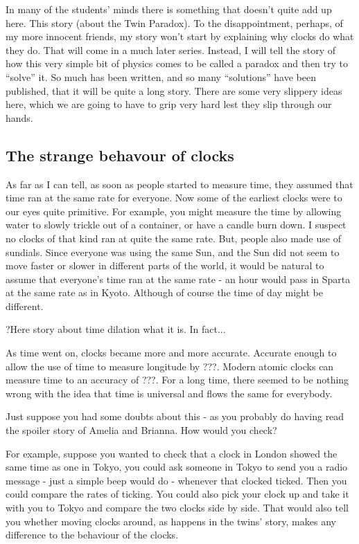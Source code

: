 \documentclass[a4paper]{report}
\begin{document}
In many of the students' minds there is something that doesn't quite add up here. This story (about the Twin Paradox). To the disappointment, perhaps, of my more innocent friends, my story won't start by explaining why clocks do what they do. That will come in a much later series. Instead, I will tell the story of how this very simple bit of physics comes to be called a paradox and then try to ``solve'' it. So much has been written, and so many ``solutions'' have been published, that it will be quite a long story. There are some very slippery ideas here, which we are going to have to grip very hard lest they slip through our hands.

\subsection*{The strange behavour of clocks}
As far as I can tell, as soon as people started to measure time, they assumed that time ran at the same rate for everyone. Now some of the earliest clocks were to our eyes quite primitive. For example, you might measure the time by allowing water to slowly trickle out of a container, or have a candle burn down. I suspect no clocks of that kind ran at quite the same rate. But, people also made use of sundials. Since everyone was using the same Sun, and the Sun did not seem to move faster or slower in different parts of the world, it would be natural to assume that everyone's time ran at the same rate - an hour would pass in Sparta at the same rate as in Kyoto. Although of course the time of day might be different.

?Here story about time dilation what it is. In fact...

As time went on, clocks became more and more accurate. Accurate enough to allow the use of time to measure longitude by ???. Modern atomic clocks can measure time to an accuracy of ???. For a long time, there seemed to be nothing wrong with the idea that time is universal and flows the same for everybody.

Just suppose you had some doubts about this - as you probably do having read the spoiler story of Amelia and Brianna. How would you check?

For example, suppose you wanted to check that a clock in London showed the same time as one in Tokyo, you could ask someone in Tokyo to send you a radio message - just a simple beep would do - whenever that clocked ticked. Then you could compare the rates of ticking. You could also pick your clock up and take it with you to Tokyo and compare the two clocks side by side. That would also tell you whether moving clocks around, as happens in the twins' story, makes any difference to the behaviour of the clocks.
\end{document}
